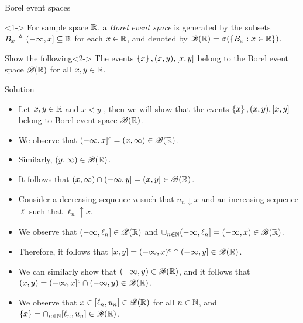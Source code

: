 \documentclass[12pt,aspectratio=169]{beamer}
\begin{document}
\begin{frame}{Borel event spaces}
    \begin{Definition}<1->
        For sample space $\mathbb{R}$, a \emph{Borel event space} is generated by the subsets $B_x \triangleq (-\infty, x] \subseteq \mathbb{R}$ for each $x \in \mathbb{R}$, and denoted by $\mathscr{B}(\mathbb{R}) = \sigma(\left\{B_x: x \in \mathbb{R}\right\})$. 
    \end{Definition}

    \begin{block}{Show the following}<2->
        The events $\left\{x\right\}, (x, y), [x, y]$ belong to the Borel event space $\mathscr{B}(\mathbb{R})$ for all $x, y \in \mathbb{R}$.  
    \end{block}
\end{frame}

\begin{frame}{Solution}
    \begin{itemize} 
        \item<1-> Let $x,y\in\mathbb{R}$ and $x < y$ , then we will show that the events $\left\{x\right\}, (x, y), [x, y]$ belong to Borel event space $\mathscr{B}(\mathbb{R})$.  
        \item<2-> We observe that $(-\infty, x]^c = (x,\infty) \in \mathscr{B}(\mathbb{R})$. 
        \item<3-> Similarly, $(y, \infty) \in \mathscr{B}(\mathbb{R})$. 
        \item<4-> It follows that $(x,\infty)\cap(-\infty, y] = (x, y] \in \mathscr{B}(\mathbb{R})$. 
        \item<5-> Consider a decreasing sequence $u$ such that $u_n \downarrow x$ and an increasing sequence $\ell$ such that $\ell_n\uparrow x$. 
        \item<6-> We observe that $(-\infty, \ell_n]\in \mathscr{B}(\mathbb{R})$ and $\cup_{n\in\mathbb{N}}(-\infty, \ell_n] = (-\infty,x) \in \mathscr{B}(\mathbb{R})$.  
        \item<7-> Therefore, it follows that $[x,y] = (-\infty, x)^c\cap(-\infty, y] \in \mathscr{B}(\mathbb{R})$. 
        \item<8-> We can similarly show that $(-\infty, y)\in \mathscr{B}(\mathbb{R})$, and it follows that $(x,y) = (-\infty, x]^c\cap(-\infty, y) \in \mathscr{B}(\mathbb{R})$. 
        \item<9-> We observe that $x \in [\ell_n,u_n] \in \mathscr{B}(\mathbb{R})$ for all $n \in \mathbb{N}$, and $\left\{x\right\} = \cap_{n \in \mathbb{N}}[\ell_n, u_n] \in \mathscr{B}(\mathbb{R})$. 
    \end{itemize}
\end{frame}
\end{document}
